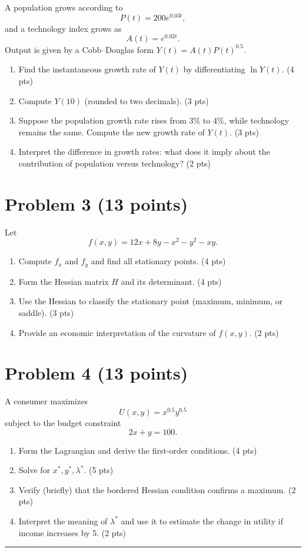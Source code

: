 \documentclass[12pt]{article}
\begin{document}
A population grows according to
\[
P(t) = 200 e^{0.03t},
\]
and a technology index grows as
\[
A(t) = e^{0.02t}.
\]
Output is given by a Cobb–Douglas form \(Y(t) = A(t) P(t)^{0.5}\).
\newpage
\begin{enumerate}[label=(\alph*),leftmargin=1.5em]
    \item Find the instantaneous growth rate of \(Y(t)\) by differentiating \(\ln Y(t)\). \hfill (4 pts)
    \item Compute \(Y(10)\) (rounded to two decimals). \hfill (3 pts)
    \item Suppose the population growth rate rises from 3\% to 4\%, while technology remains the same. Compute the new growth rate of \(Y(t)\). \hfill (3 pts)
    \item Interpret the difference in growth rates: what does it imply about the contribution of population versus technology? \hfill (2 pts)
\end{enumerate}



\section*{Problem 3 (13 points)}

Let
\[
f(x,y) = 12x + 8y - x^2 - y^2 - xy.
\]

\begin{enumerate}[label=(\alph*),leftmargin=1.5em]
    \item Compute \(f_x\) and \(f_y\) and find all stationary points. \hfill (4 pts)
    \item Form the Hessian matrix \(H\) and its determinant. \hfill (4 pts)
    \item Use the Hessian to classify the stationary point (maximum, minimum, or saddle). \hfill (3 pts)
    \item Provide an economic interpretation of the curvature of \(f(x,y)\). \hfill (2 pts)
\end{enumerate}



\section*{Problem 4 (13 points)}

A consumer maximizes
\[
U(x,y) = x^{0.5} y^{0.5}
\]
subject to the budget constraint
\[
2x + y = 100.
\]

\begin{enumerate}[label=(\alph*),leftmargin=1.5em]
    \item Form the Lagrangian and derive the first-order conditions. \hfill (4 pts)
    \item Solve for \(x^*, y^*, \lambda^*\). \hfill (5 pts)
    \item Verify (briefly) that the bordered Hessian condition confirms a maximum. \hfill (2 pts)
    \item Interpret the meaning of \(\lambda^*\) and use it to estimate the change in utility if income increases by 5. \hfill (2 pts)
\end{enumerate}

\vspace{10pt}
\hrule
\vspace{8pt}
\end{document}

